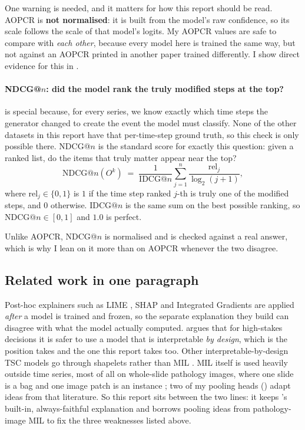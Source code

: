 One warning is needed, and it matters for how this report should be read. AOPCR is \textbf{not
normalised}: it is built from the model's raw confidence, so its scale follows the scale of that
model's logits. My AOPCR values are safe to compare with \emph{each other}, because every model here
is trained the same way, but not against an AOPCR printed in another paper trained differently. I
show direct evidence for this in .

\paragraph{NDCG@$n$: did the model rank the truly modified steps at the top?}
\webtraffic{} is special because, for every series, we know exactly which time steps the generator
changed to create the event the model must classify. None of the other datasets in this report have
that per-time-step ground truth, so this check is only possible there. NDCG@$n$
\citep{jarvelin2002ndcg} is the standard score for exactly this question: given a ranked list, do
the items that truly matter appear near the top?
\begin{equation}
  \text{NDCG@}n(O^k) \;=\; \frac{1}{\text{IDCG@}n}\sum_{j=1}^{n}
  \frac{\text{rel}_j}{\log_2(j+1)} ,
  \label{eq:ndcg}
\end{equation}
where $\text{rel}_j \in \{0,1\}$ is $1$ if the time step ranked $j$-th is truly one of the modified
steps, and $0$ otherwise. $\text{IDCG@}n$ is the same sum on the best possible ranking, so
$\text{NDCG@}n \in [0,1]$ and $1.0$ is perfect.

Unlike AOPCR, NDCG@$n$ is normalised and is checked against a real answer, which is why I lean on it
more than on AOPCR whenever the two disagree.

\subsection{Related work in one paragraph}
\label{sec:bg:related}

Post-hoc explainers such as LIME \citep{ribeiro2016lime}, SHAP \citep{lundberg2017shap} and
Integrated Gradients \citep{sundararajan2017ig} are applied \emph{after} a model is trained and
frozen, so the separate explanation they build can disagree with what the model actually computed.
\citet{rudin2019stop} argues that for high-stakes decisions it is safer to use a model that is
interpretable \emph{by design}, which is the position \millet{} takes and the one this report takes
too. Other interpretable-by-design TSC models go through shapelets rather than MIL
\citep{wen2025interpgn, wen2024vqshape}. MIL itself is used heavily outside time series, most of all
on whole-slide pathology images, where one slide is a bag and one image patch is an instance
\citep{ilse2018attention, hashimoto2020msdamil, li2021dsmil}; two of my pooling heads
() adapt ideas from that literature. So this report sits between the two lines: it
keeps \millet{}'s built-in, always-faithful explanation and borrows pooling ideas from
pathology-image MIL to fix the three weaknesses listed above.
